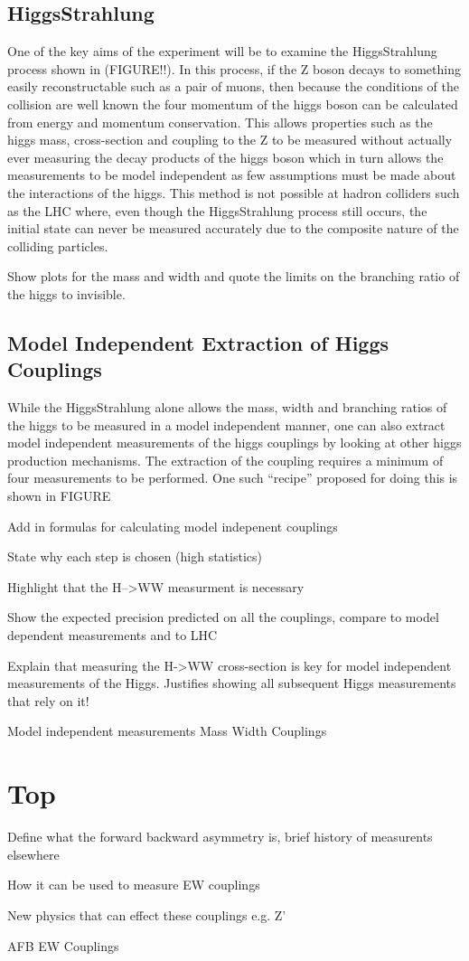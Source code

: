 \subsection{HiggsStrahlung}

One of the key aims of the experiment will be to examine the HiggsStrahlung process shown in (FIGURE!!). In this process, if the Z boson decays to something easily reconstructable such as a pair of muons, then because the conditions of the collision are well known the four momentum of the higgs boson can be calculated from energy and momentum conservation. This allows properties such as the higgs mass, cross-section and coupling to the Z to be measured without actually ever measuring the decay products of the higgs boson which in turn allows the measurements to be model independent as few assumptions must be made about the interactions of the higgs. This method is not possible at hadron colliders such as the LHC where, even though the HiggsStrahlung process still occurs, the initial state can never be measured accurately due to the composite nature of the colliding particles. 

Show plots for the mass and width and quote the limits on the branching ratio of the higgs to invisible.


\subsection{Model Independent Extraction of Higgs Couplings}


While the HiggsStrahlung alone allows the mass, width and branching ratios of the higgs to be measured in a model independent manner, one can also extract model independent measurements of the higgs couplings by looking at other higgs production mechanisms. The extraction of the coupling requires a minimum of four measurements to be performed. One such ``recipe'' proposed for doing this is shown in FIGURE

Add in formulas for calculating model indepenent couplings

State why each step is chosen (high statistics) 

Highlight that the H-->WW measurment is necessary

Show the expected precision predicted on all the couplings, compare to model dependent measurements and to LHC




Explain that measuring the H->WW cross-section is key for model independent measurements of the Higgs. Justifies showing all subsequent Higgs measurements that rely on it!

Model independent measurements
Mass
Width
Couplings

\section{Top}

Define what the forward backward asymmetry is, brief history of measurents elsewhere

How it can be used to measure EW couplings

New physics that can effect these couplings e.g. Z'



AFB
EW Couplings


